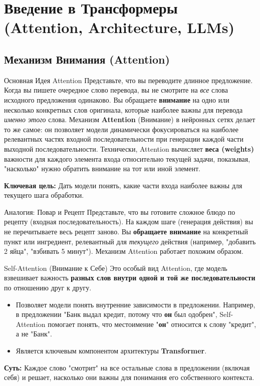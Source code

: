 
\section{Введение в Трансформеры (Attention, Architecture, LLMs)}

\subsection{Механизм Внимания (Attention)}

\begin{textbox}{Основная Идея Attention}
    Представьте, что вы переводите длинное предложение. Когда вы пишете очередное слово перевода, вы не смотрите на \textit{все} слова исходного предложения одинаково. Вы обращаете \textbf{внимание} на одно или несколько конкретных слов оригинала, которые наиболее важны для перевода \textit{именно этого} слова.
    Механизм \textbf{Attention} (Внимание) в нейронных сетях делает то же самое: он позволяет модели динамически фокусироваться на наиболее релевантных частях входной последовательности при генерации каждой части выходной последовательности.
    Технически, Attention вычисляет \textbf{веса (weights)} важности для каждого элемента входа относительно текущей задачи, показывая, "насколько" нужно обратить внимание на тот или иной элемент.

    \textbf{Ключевая цель:} Дать модели понять, какие части входа наиболее важны для текущего шага обработки.
\end{textbox}

\begin{myexampleblock}{Аналогия: Повар и Рецепт}
    Представьте, что вы готовите сложное блюдо по рецепту (входная последовательность). На каждом шаге (генерация действия) вы не перечитываете весь рецепт заново. Вы \textbf{обращаете внимание} на конкретный пункт или ингредиент, релевантный для \textit{текущего} действия (например, "добавить 2 яйца", "взбивать 5 минут"). Механизм Attention работает похожим образом.
\end{myexampleblock}

\begin{myblock}{Self-Attention (Внимание к Себе)}
    Это особый вид Attention, где модель взвешивает важность \textbf{разных слов внутри одной и той же последовательности} по отношению друг к другу.
    \begin{itemize}
        \item Позволяет модели понять внутренние зависимости в предложении. Например, в предложении "Банк выдал кредит, потому что \textbf{он} был одобрен", Self-Attention помогает понять, что местоимение "\textbf{он}" относится к слову "кредит", а не "Банк".
        \item Является ключевым компонентом архитектуры \textbf{Transformer}.
    \end{itemize}
    \textbf{Суть:} Каждое слово "смотрит" на все остальные слова в предложении (включая себя) и решает, насколько они важны для понимания его собственного контекста.
\end{myblock}

